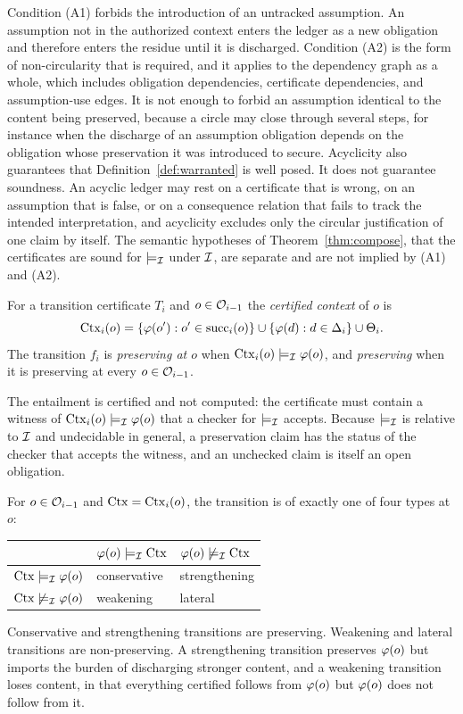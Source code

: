 Condition (A1) forbids the introduction of an untracked assumption. An assumption not in the authorized context enters the ledger as a new obligation and therefore enters the residue until it is discharged. Condition (A2) is the form of non-circularity that is required, and it applies to the dependency graph as a whole, which includes obligation dependencies, certificate dependencies, and assumption-use edges. It is not enough to forbid an assumption identical to the content being preserved, because a circle may close through several steps, for instance when the discharge of an assumption obligation depends on the obligation whose preservation it was introduced to secure. Acyclicity also guarantees that Definition~\ref{def:warranted} is well posed. It does not guarantee soundness. An acyclic ledger may rest on a certificate that is wrong, on an assumption that is false, or on a consequence relation that fails to track the intended interpretation, and acyclicity excludes only the circular justification of one claim by itself. The semantic hypotheses of Theorem~\ref{thm:compose}, that the certificates are sound for $\models_{\mathcal{I}}$ under $\mathcal{I}$, are separate and are not implied by (A1) and (A2).

\begin{definition}
For a transition certificate $T_i$ and $o \in \mathcal{O}_{i-1}$ the \emph{certified context} of $o$ is
\[
\operatorname{Ctx}_i(o) = \{\varphi(o') : o' \in \operatorname{succ}_i(o)\} \cup \{\varphi(d) : d \in \Delta_i\} \cup \Theta_i .
\]
The transition $f_i$ is \emph{preserving at $o$} when $\operatorname{Ctx}_i(o) \models_{\mathcal{I}} \varphi(o)$, and \emph{preserving} when it is preserving at every $o \in \mathcal{O}_{i-1}$.
\end{definition}

The entailment is certified and not computed: the certificate must contain a witness of $\operatorname{Ctx}_i(o) \models_{\mathcal{I}} \varphi(o)$ that a checker for $\models_{\mathcal{I}}$ accepts. Because $\models_{\mathcal{I}}$ is relative to $\mathcal{I}$ and undecidable in general, a preservation claim has the status of the checker that accepts the witness, and an unchecked claim is itself an open obligation.

\begin{definition}
\label{def:typing}
For $o \in \mathcal{O}_{i-1}$ and $\operatorname{Ctx} = \operatorname{Ctx}_i(o)$, the transition is of exactly one of four types at $o$:
\begin{center}
\begin{tabular}{@{}lll@{}}
\toprule
 & $\varphi(o) \models_{\mathcal{I}} \operatorname{Ctx}$ & $\varphi(o) \not\models_{\mathcal{I}} \operatorname{Ctx}$ \\
\midrule
$\operatorname{Ctx} \models_{\mathcal{I}} \varphi(o)$ & conservative & strengthening \\
$\operatorname{Ctx} \not\models_{\mathcal{I}} \varphi(o)$ & weakening & lateral \\
\bottomrule
\end{tabular}
\end{center}
Conservative and strengthening transitions are preserving. Weakening and lateral transitions are non-preserving. A strengthening transition preserves $\varphi(o)$ but imports the burden of discharging stronger content, and a weakening transition loses content, in that everything certified follows from $\varphi(o)$ but $\varphi(o)$ does not follow from it.
\end{definition}

